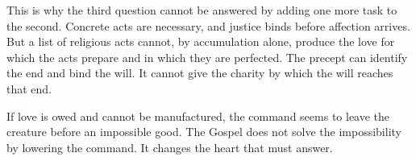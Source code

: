 This is why the third question cannot be answered by adding one more task to the second. Concrete acts are necessary, and justice binds before affection arrives. But a list of religious acts cannot, by accumulation alone, produce the love for which the acts prepare and in which they are perfected. The precept can identify the end and bind the will. It cannot give the charity by which the will reaches that end.

If love is owed and cannot be manufactured, the command seems to leave the creature before an impossible good. The Gospel does not solve the impossibility by lowering the command. It changes the heart that must answer.
